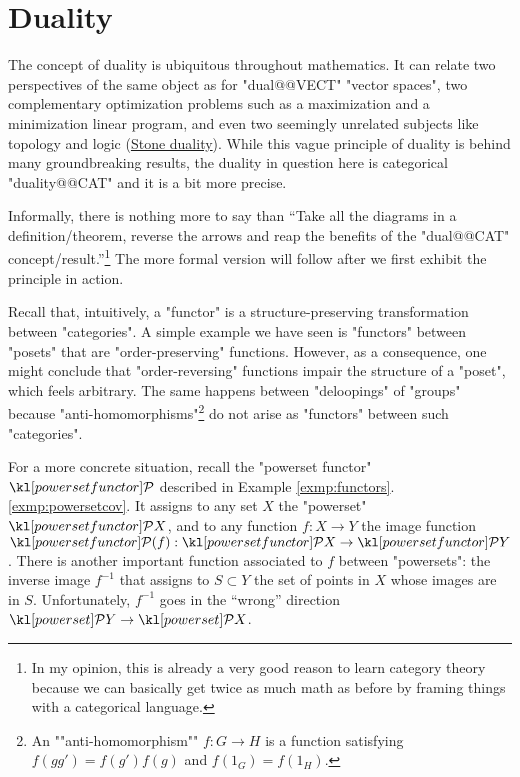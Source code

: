 \documentclass[main.tex]{subfiles}
\begin{document}
\chapter{Duality}\label{chap:duality}
The concept of duality is ubiquitous throughout mathematics. It can relate two perspectives of the same object as for "dual@@VECT" "vector spaces", two complementary optimization problems such as a maximization and a minimization linear program, and even two seemingly unrelated subjects like topology and logic (\href{https://en.wikipedia.org/wiki/Stone_duality}{Stone duality}). While this vague principle of duality is behind many groundbreaking results, the duality in question here is categorical "duality@@CAT" and it is a bit more precise.%

Informally, there is nothing more to say than ``Take all the diagrams in a definition/theorem, reverse the arrows and reap the benefits of the "dual@@CAT" concept/result.''\footnote{In my opinion, this is already a very good reason to learn category theory because we can basically get twice as much math as before by framing things with a categorical language.} The more formal version will follow after we first exhibit the principle in action.

Recall that, intuitively, a "functor" is a structure-preserving transformation between "categories". A simple example we have seen is "functors" between "posets" that are "order-preserving" functions. However, as a consequence, one might conclude that "order-reversing" functions impair the structure of a "poset", which feels arbitrary. The same happens between "deloopings" of "groups" because "anti-homomorphisms"\footnote{\AP An ""anti-homomorphism"" $f: G \rightarrow H$ is a function satisfying $f(gg') = f(g')f(g)$ and $f(1_G) = f(1_H)$.} do not arise as "functors" between such "categories".

For a more concrete situation, recall the "powerset functor" $\mPcov$ described in Example \ref{exmp:functors}.\ref{exmp:powersetcov}. It assigns to any set $X$ the "powerset" $\mPcov X$, and to any function $f: X \rightarrow Y$ the image function $\mPcov(f): \mPcov X \rightarrow \mPcov Y$. There is another important function associated to $f$ between "powersets": the inverse image $f^{-1}$ that assigns to $S \subset Y$ the set of points in $X$ whose images are in $S$. Unfortunately, $f^{-1}$ goes in the ``wrong'' direction $\mP Y \rightarrow \mP X$.
\end{document}
